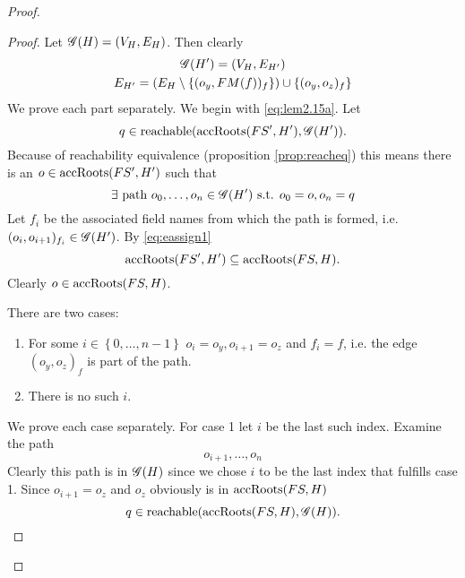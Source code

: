 \begin{proof}
\begin{description}
\begin{description}
\begin{description}
              \begin{proof}
                Let $\mathscr{G}(H) = (V_H, E_H)$. Then clearly
                \begin{equation}
                  \begin{gathered}
                    \mathscr{G}(H') = (V_H, E_{H'}) \\
                    E_{H'} = (E_H \setminus \{(o_y, FM(f))_f \}) \cup \{(o_y,
                    o_z)_f \}
                  \end{gathered}
                \end{equation}
                We prove each part separately.  We begin with
                \eqref{eq:lem2.15a}.  Let
                \begin{equation*}
                  q \in \mbox{$\mathrm{reachable}$}(\mbox{$\mathrm{accRoots}$}(FS', H'), \mathscr{G}(H')).
                \end{equation*}
                Because of reachability equivalence (proposition
                \ref{prop:reacheq}) this means there is an $o \in \mbox{$\mathrm{accRoots}$}(FS',
                H')$ such that
                \begin{equation}
                  \exists \text{ path } o_0, \dots, o_n \in \mathscr{G}(H')
                  \text{ s.t. } o_0 = o, o_n = q
                \end{equation}
                Let $f_i$ be the associated field names from which the path is
                formed, i.e. $(o_i, o_{i+1})_{f_i} \in \mathscr{G}(H')$.
                By \eqref{eq:eassign1}
                \begin{equation}
                  \mbox{$\mathrm{accRoots}$}(FS', H') \subseteq \mbox{$\mathrm{accRoots}$}(FS, H).
                \end{equation}
                Clearly $o \in \mbox{$\mathrm{accRoots}$}(FS, H)$.

                There are two cases:
                \begin{enumerate}
                  \item For some $i \in \left\{ 0, \dots, n-1 \right\}$ $o_i =
                    o_y, o_{i+1} = o_z$ and $f_i = f$, i.e. the edge $(o_y,
                    o_z)_{f}$ is part of the path.
                  \item There is no such $i$.
                \end{enumerate}
                We prove each case separately. For case 1 let $i$ be the last
                such index. Examine the path 
                \begin{equation}
                  o_{i+1}, \dots, o_n
                \end{equation}
                Clearly this path is in $\mathscr{G}(H)$ since we chose $i$ to be the
                last index that fulfills case 1.  Since $o_{i+1} = o_z$ and
                $o_z$ obviously is in $\mbox{$\mathrm{accRoots}$}(FS, H)$
                \begin{equation}
                  q \in \mbox{$\mathrm{reachable}$}(\mbox{$\mathrm{accRoots}$}(FS, H), \mathscr{G}(H)).
                \end{equation}


\end{proof}
\end{description}
\end{description}
\end{description}
\end{proof}
